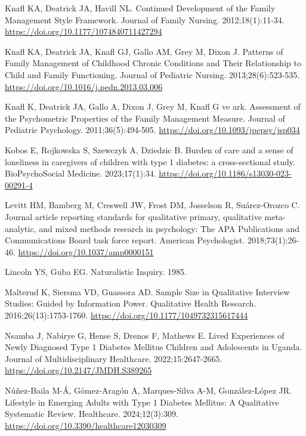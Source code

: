 \documentclass[
  turkish,
  a4paper,
  DIV=11,
  numbers=noendperiod]{scrreprt}
\newlength{\cslhangindent}
\newenvironment{CSLReferences}[2] %
 {\begin{list}{}{%
  \setlength{\itemindent}{0pt}
  \setlength{\leftmargin}{0pt}
  \setlength{\parsep}{0pt}
  \ifodd #1
   \setlength{\leftmargin}{\cslhangindent}
   \setlength{\itemindent}{-1\cslhangindent}
  \fi
  \setlength{\itemsep}{#2\baselineskip}}}
 {\end{list}}
\begin{document}
\begin{CSLReferences}{1}{0}
Knafl KA, Deatrick JA, Havill NL. Continued Development of the Family
Management Style Framework. Journal of Family Nursing. 2012;18(1):11-34.
\url{https://doi.org/10.1177/1074840711427294}

Knafl KA, Deatrick JA, Knafl GJ, Gallo AM, Grey M, Dixon J. Patterns of
Family Management of Childhood Chronic Conditions and Their Relationship
to Child and Family Functioning. Journal of Pediatric Nursing.
2013;28(6):523-535. \url{https://doi.org/10.1016/j.pedn.2013.03.006}

Knafl K, Deatrick JA, Gallo A, Dixon J, Grey M, Knafl G ve ark.
Assessment of the Psychometric Properties of the Family Management
Measure. Journal of Pediatric Psychology. 2011;36(5):494-505.
\url{https://doi.org/10.1093/jpepsy/jsp034}

Kobos E, Rojkowska S, Szewczyk A, Dziedzic B. Burden of care and a sense
of loneliness in caregivers of children with type 1 diabetes: a
cross-sectional study. BioPsychoSocial Medicine. 2023;17(1):34.
\url{https://doi.org/10.1186/s13030-023-00291-4}

Levitt HM, Bamberg M, Creswell JW, Frost DM, Josselson R, Suárez-Orozco
C. Journal article reporting standards for qualitative primary,
qualitative meta-analytic, and mixed methods research in psychology:
{The} {APA} {Publications} and {Communications} {Board} task force
report. American Psychologist. 2018;73(1):26-46.
\url{https://doi.org/10.1037/amp0000151}

Lincoln YS, Guba EG. Naturalistic Inquiry. 1985.

Malterud K, Siersma VD, Guassora AD. Sample Size in Qualitative
Interview Studies: Guided by Information Power. Qualitative Health
Research. 2016;26(13):1753-1760.
\url{https://doi.org/10.1177/1049732315617444}

Nsamba J, Nabirye G, Hense S, Drenos F, Mathews E. Lived Experiences of
Newly Diagnosed Type 1 Diabetes Mellitus Children and Adolescents in
Uganda. Journal of Multidisciplinary Healthcare. 2022;15:2647-2665.
\url{https://doi.org/10.2147/JMDH.S389265}

Núñez-Baila M-Á, Gómez-Aragón A, Marques-Silva A-M, González-López JR.
Lifestyle in Emerging Adults with Type 1 Diabetes Mellitus: A
Qualitative Systematic Review. Healthcare. 2024;12(3):309.
\url{https://doi.org/10.3390/healthcare12030309}


\end{CSLReferences}
\end{document}
